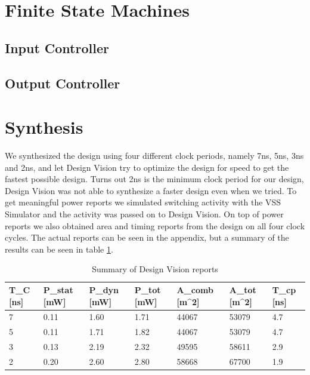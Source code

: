 \documentclass[11pt,a4paper]{article}
\begin{document}
\section{Finite State Machines}
\subsection{Input Controller}

\subsection{Output Controller}


\FloatBarrier
\section{Synthesis}
We synthesized the design using four different clock periods, namely 7ns, 5ns, 3ns and 2ns, and let Design Vision try to optimize the design for speed to get the fastest possible design. Turns out 2ns is the minimum clock period for our design, Design Vision was not able to synthesize a faster design even when we tried. To get meaningful power reports we simulated switching activity with the VSS Simulator and the activity was passed on to Design Vision. On top of power reports we also obtained area and timing reports from the design on all four clock cycles. The actual reports can be seen in the appendix, but a summary of the results can be seen in table \ref{tab:synth}.

\begin{table}[h]
	\caption{Summary of Design Vision reports}
	\begin{center}
		\begin{tabular}{|l|l|l|l|l|l|l|} \hline
			\textbf{T}_{C} [ns]	& \textbf{P}_{stat}	[mW] & \textbf{P}_{dyn} [mW]	& \textbf{P}_{tot} [mW] & \textbf{A}_{comb} [\mu m^2]& \textbf{A}_{tot} [\mu m^2] & \textbf{T}_{cp} [ns] \\ \hline
			7 & 0.11 & 1.60 & 1.71 & 44067 & 53079 & 4.7 \\ \hline
			5 & 0.11 & 1.71 & 1.82 & 44067 & 53079 & 4.7 \\ \hline
			3 & 0.13 & 2.19 & 2.32 & 49595 & 58611 & 2.9 \\ \hline
			2 & 0.20 & 2.60 & 2.80 & 58668 & 67700 & 1.9 \\ \hline
			
		\end{tabular}
	\end{center}
	\label{tab:synth}
\end{table}
\end{document}
